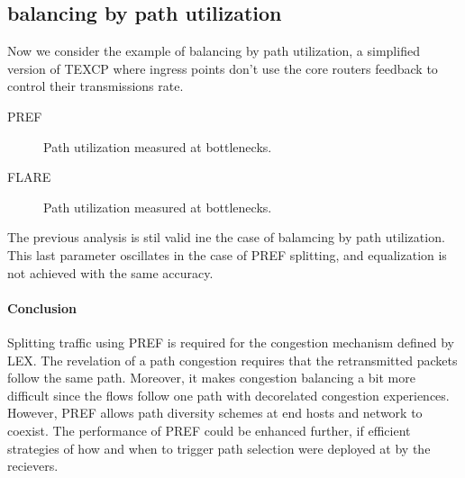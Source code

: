 
\subsection{balancing by path utilization}

Now we consider the example of balancing by path utilization, a simplified version of TEXCP where ingress points don't use the core routers feedback to control their transmissions rate.

PREF

\begin{figure}[h]
 \begin{center}

\caption{
  Path utilization measured at bottlenecks. 
    \label{fig:texcp-util-pref}
}
\end{center}
\end{figure}

FLARE
 \begin{figure}[h!]
 \begin{center}
\caption{
  Path utilization measured at bottlenecks. 
    \label{fig:texcp-util-flare}
}
\end{center}
\end{figure}

The previous analysis is stil valid ine the case of balamcing by path utilization. This last parameter oscillates in the case of PREF splitting, and equalization is not achieved with the same accuracy.

\paragraph{Conclusion}

Splitting traffic using PREF is required for the congestion mechanism defined by LEX. The revelation of a path congestion requires that the retransmitted packets follow the same path. Moreover, it makes congestion balancing a bit more difficult since the flows follow one path with decorelated congestion experiences. However, PREF allows path diversity schemes at end hosts and network to coexist. The performance of PREF could be enhanced further, if efficient strategies of how and when to trigger path selection were deployed at by the recievers.
 
